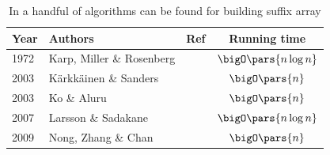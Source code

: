 \begin{table}[H]
    \centering
    \setlength{\tabcolsep}{11pt}
    \renewcommand{\arraystretch}{1.1}
    \begin{tabular}{llcc}
        \toprule
        Year & Authors & Ref & Running time \\
        \midrule
        1972 & Karp, Miller \& Rosenberg & \cite{karp1972} & \(\bigO\pars{n \log n}\) \\
        2003 & K\"arkk\"ainen \& Sanders & \cite{karkkainen2003} & \(\bigO\pars{n}\) \\
        2003 & Ko \& Aluru & \cite{ko2003} & \(\bigO\pars{n}\) \\
        2007 & Larsson \& Sadakane & \cite{larsson2007} & \(\bigO\pars{n \log n}\) \\
        2009 & Nong, Zhang \& Chan & \cite{nong2009} & \(\bigO\pars{n}\) \\
        \bottomrule
    \end{tabular}
    \caption{In \cite{string-algorithms} a handful of algorithms can be found for building suffix array}
    \label{tab:sa-construction}
\end{table}